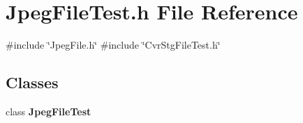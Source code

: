 \section{Jpeg\+File\+Test.\+h File Reference}
\label{JpegFileTest_8h}
{\ttfamily \#include \char`\"{}Jpeg\+File.\+h\char`\"{}}\newline
{\ttfamily \#include \char`\"{}Cvr\+Stg\+File\+Test.\+h\char`\"{}}\newline
\subsection*{Classes}
\begin{DoxyCompactItemize}
\item 
class \textbf{ Jpeg\+File\+Test}
\end{DoxyCompactItemize}
